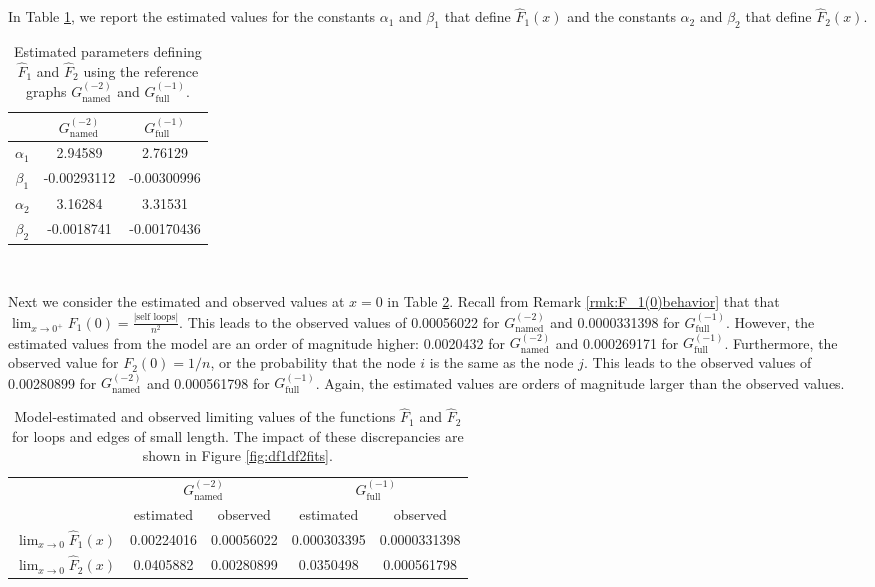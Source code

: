 \documentclass[11]{article}
\newcommand{\namedtwo}{G_{\textrm{named}}^{(-2)}}
\newcommand{\fullone}{G_{\textrm{full}}^{(-1)}}
\theoremstyle{remark}
\theoremstyle{definition}
\begin{document}
In Table \ref{table:parambounds}, we report the estimated values for the constants $\alpha_1$ and $\beta_1$ that define $\hat F_1(x)$ and the constants $\alpha_2$ and $\beta_2$ that define $\hat F_2(x)$. 




\begin{table}[h!]
\centering
\begin{tabular}{|c | c || c |} \hline
 & $\namedtwo$ & $\fullone$ \\ \hline
$\alpha_1$ & 2.94589 &  2.76129 \\ \hline
$\beta_1$ & -0.00293112  & -0.00300996 \\ \hline
$\alpha_2$ & 3.16284  & 3.31531 \\ \hline
$\beta_2$ & -0.0018741  & -0.00170436  \\ \hline
\end{tabular} \\

\caption{Estimated parameters defining $\hat F_1$ and $\hat F_2$ using the reference graphs $\namedtwo$ and $\fullone$. }
\label{table:parambounds}
\end{table} 

Next we consider the estimated and observed values at $x = 0$ in Table \ref{table:limiting values}. Recall from Remark \ref{rmk:F_1(0)behavior} that that $\lim_{x \to 0^+}F_1(0) = \frac{|\textrm{self loops}|}{n^2}$. This leads to the observed values of 0.00056022 for $\namedtwo$ and 0.0000331398 for $\fullone$. However, the estimated values from the model are an order of magnitude higher: 0.0020432 for $\namedtwo$ and 0.000269171 for $\fullone$. Furthermore, the observed value for $F_2(0) = 1/n$, or the probability that the node $i$ is the same as the node $j$.  This leads to the observed values of 0.00280899 for $\namedtwo$ and 0.000561798 for $\fullone$. Again, the estimated values are orders of magnitude larger than the observed values.
\begin{table}[h!]
\centering
\begin{tabular}{|c |c | c || c |c |} \hline
 & \multicolumn{2}{c||}{$\namedtwo$} & \multicolumn{2}{c|}{$\fullone$} \\ \cline{2-5}
 & estimated & observed  & estimated & observed  \\ \hline
$\lim_{x \rightarrow 0} \hat F_1(x)$ & 0.00224016 &  0.00056022 &  0.000303395 & 0.0000331398  \\ \hline
$\lim_{x \rightarrow 0} \hat F_2(x)$ & 0.0405882  & 0.00280899 &  0.0350498 & 0.000561798   \\ \hline
\end{tabular}
\caption{Model-estimated and observed limiting values of the functions $\hat F_1$ and $\hat F_2$ for loops and edges of small length. The impact of these discrepancies are shown in Figure \ref{fig:df1df2fits}.} 
\label{table:limiting values}
\end{table} 
\end{document}
